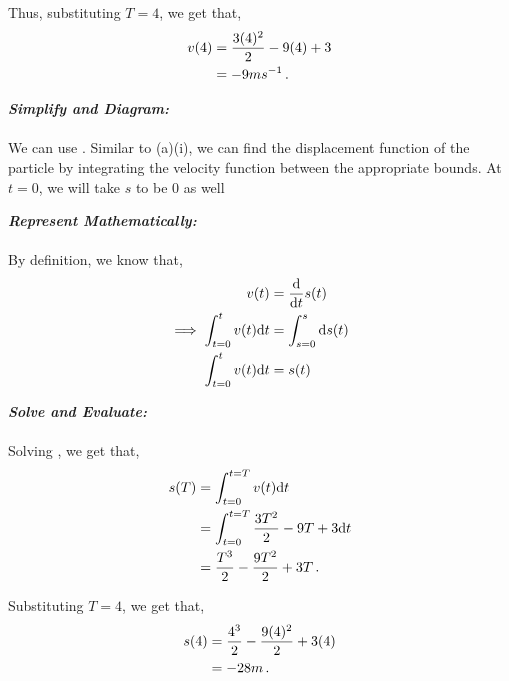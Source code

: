 \begin{subquestions}
\begin{subsubquestions}
Thus, substituting $T=4$, we get that,
\begin{align}
	v(4) & = \frac{3(4)^2}{2}-9(4) +3 \nonumber \\
	     & = -9ms^{-1} \,.
\end{align}



\subsubquestion

\textbf{\textit{Simplify and Diagram:}} \\ \\
We can use . Similar to (a)(i), we can find the displacement function of the particle by integrating the velocity function between the appropriate bounds. At $t=0$, we will take $s$ to be $0$ as well




\textbf{\textit{Represent Mathematically:}} \\ \\
By definition, we know that,
\begin{align}
	v(t) & = \frac{\mathrm{d}}{\mathrm{d}t}s(t) \nonumber \\
	\implies \int_{t=0}^{t}v(t)\mathrm{d} t & = \int_{s=0}^{s} \mathrm{d} s(t) \nonumber \\
	\int_{t=0}^{t}v(t)\mathrm{d} t & = s(t)  \label{2009:q6:SEqn1}
\end{align}




\textbf{\textit{Solve and Evaluate:}} \\ \\
Solving , we get that,
\begin{align}
	s(T) & = \int_{t=0}^{t=T} v(t)\mathrm{d} t \nonumber \\
	      & = \int_{t=0}^{t=T} \frac{3T^2}{2}-9T +3 \mathrm{d} t \nonumber \\
	      & = \frac{T^3}{2} - \frac{9T^2}{2} + 3T \,.
\end{align}

Substituting $T=4$, we get that,
\begin{align}
	s(4) & = \frac{4^3}{2} - \frac{9(4)^2}{2} + 3(4) \nonumber \\
	     & = -28m\,.
\end{align}
	
\end{subsubquestions}



\end{subquestions}
